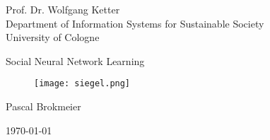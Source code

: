 \begin{titlepage}
\setlength{\parindent}{0pt} %
\begin{center}

\small{Prof. Dr. Wolfgang Ketter \\
Department of Information Systems for Sustainable Society \\
University of Cologne\\}
\vspace{20mm}

\Huge{Social Neural Network Learning}

\vspace{10mm}
\begin{figure}[!h]
    \centering
    \texttt{[image: siegel.png]}
\end{figure}

\vspace{10mm}

\small{
Pascal Brokmeier
}

\vspace{10mm}
\today
{}
\end{center}
\end{titlepage}
